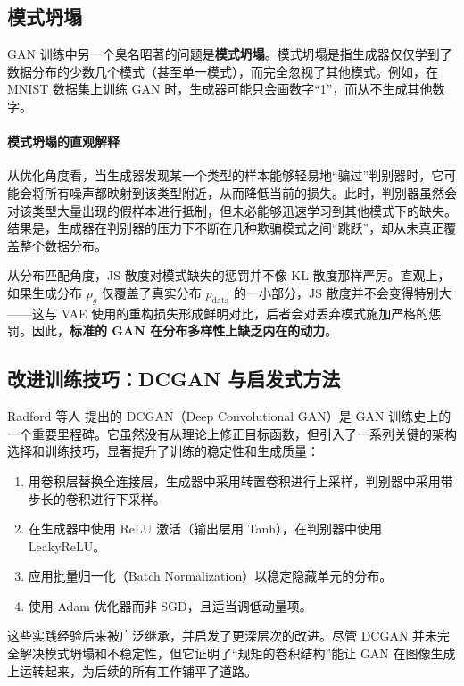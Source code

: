 \subsection{模式坍塌}

GAN 训练中另一个臭名昭著的问题是\textbf{模式坍塌}。模式坍塌是指生成器仅仅学到了数据分布的少数几个模式（甚至单一模式），而完全忽视了其他模式。例如，在 MNIST 数据集上训练 GAN 时，生成器可能只会画数字“1”，而从不生成其他数字。

\paragraph{模式坍塌的直观解释}

从优化角度看，当生成器发现某一个类型的样本能够轻易地“骗过”判别器时，它可能会将所有噪声都映射到该类型附近，从而降低当前的损失。此时，判别器虽然会对该类型大量出现的假样本进行抵制，但未必能够迅速学习到其他模式下的缺失。结果是，生成器在判别器的压力下不断在几种欺骗模式之间“跳跃”，却从未真正覆盖整个数据分布。

从分布匹配角度，JS 散度对模式缺失的惩罚并不像 KL 散度那样严厉。直观上，如果生成分布 $p_g$ 仅覆盖了真实分布 $p_{\text{data}}$ 的一小部分，JS 散度并不会变得特别大——这与 VAE 使用的重构损失形成鲜明对比，后者会对丢弃模式施加严格的惩罚。因此，\textbf{标准的 GAN 在分布多样性上缺乏内在的动力}。

\subsection{改进训练技巧：DCGAN 与启发式方法}

Radford 等人\cite{radford2016unsupervisedrepresentationlearningdeep} 提出的 DCGAN（Deep Convolutional GAN）是 GAN 训练史上的一个重要里程碑。它虽然没有从理论上修正目标函数，但引入了一系列关键的架构选择和训练技巧，显著提升了训练的稳定性和生成质量：

\begin{enumerate}
\item 用卷积层替换全连接层，生成器中采用转置卷积进行上采样，判别器中采用带步长的卷积进行下采样。
\item 在生成器中使用 ReLU 激活（输出层用 Tanh），在判别器中使用 LeakyReLU。
\item 应用批量归一化（Batch Normalization）以稳定隐藏单元的分布。
\item 使用 Adam 优化器而非 SGD，且适当调低动量项。
\end{enumerate}

这些实践经验后来被广泛继承，并启发了更深层次的改进。尽管 DCGAN 并未完全解决模式坍塌和不稳定性，但它证明了“规矩的卷积结构”能让 GAN 在图像生成上运转起来，为后续的所有工作铺平了道路。

